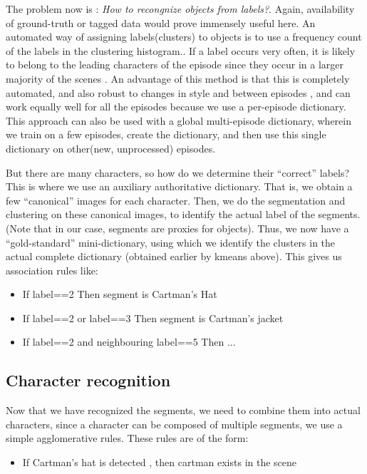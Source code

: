 \documentclass[10pt,twocolumn,letterpaper]{article}
\begin{document}
The problem now is : \emph{How to recongnize objects from labels?}.
Again, availability of ground-truth or tagged data would prove
immensely useful here. An automated way of assigning labels(clusters)
to objects is to use a frequency count of the labels in the clustering
histogram.. If a label occurs very often, it is likely to belong to
the leading characters of the episode since they occur in a larger
majority of the scenes . An advantage of this method is that this is
completely automated, and also robust to changes in style and between
episodes , and can work equally well for all the episodes because we
use a per-episode dictionary. This approach can also be used with a
global multi-episode dictionary, wherein we train on a few episodes,
create the dictionary, and then use this single dictionary on
other(new, unprocessed) episodes.

But there are many characters, so how do we determine their
``correct'' labels?  This is where we use an auxiliary authoritative
dictionary. That is, we obtain a few ``canonical'' images for each
character. Then, we do the segmentation and clustering on these
canonical images, to identify the actual label of the segments. (Note
that in our case, segments are proxies for objects). Thus, we now have
a ``gold-standard'' mini-dictionary, using which we identify the
clusters in the actual complete dictionary (obtained earlier by kmeans
above). This gives us association rules like:

\begin{itemize}
\item If label==2 Then segment is Cartman's Hat
\item If label==2 or label==3 Then segment is Cartman's jacket
\item If label==2 and neighbouring label==5 Then ...
\end{itemize}

\subsection{Character recognition}

Now that we have recognized the segments, we need to combine them into
actual characters, since a character can be composed of multiple
segments, we use a simple agglomerative rules. These rules are of the
form:

\begin{itemize}
\item If Cartman's hat is detected , then cartman exists in the scene
\end{itemize}
\end{document}
